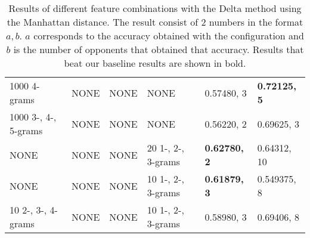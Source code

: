\begin{landscape}
\begin{table}
\begin{tabular}{llll|ll}
        1000 4-grams & NONE & NONE & NONE & 0.57480, 3 & \textbf{0.72125, 5} \\
        1000 3-, 4-, 5-grams & NONE & NONE & NONE & 0.56220, 2 & 0.69625, 3 \\
        NONE & NONE & NONE & 20 1-, 2-, 3-grams & \textbf{0.62780, 2} &
        0.64312, 10 \\
        NONE & NONE & NONE & 10 1-, 2-, 3-grams & \textbf{0.61879, 3} &
        0.549375, 8 \\
        10 2-, 3-, 4-grams & NONE & NONE & 10 1-, 2-, 3-grams & 0.58980, 3 &
        0.69406, 8
    \end{tabular}
    \caption{Results of different feature combinations with the Delta method
    using the Manhattan distance. The result consist of 2 numbers in the format
    $a, b$. $a$ corresponds to the accuracy obtained with the configuration and
    $b$ is the number of opponents that obtained that accuracy. Results that
    beat our baseline results are shown in bold.}
    \label{fig:extended_delta_method_manhattan_result}
\end{table}
\end{landscape}


